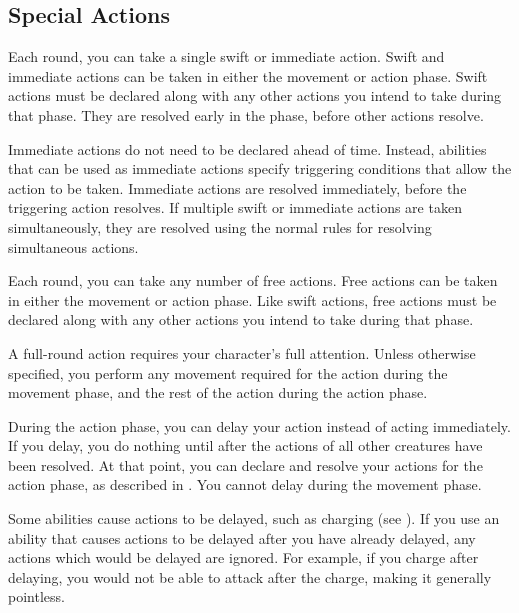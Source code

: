    \subsection{Special Actions}

        \label{Swift and Immediate Actions} Each round, you can take a single swift or immediate action.
        Swift and immediate actions can be taken in either the movement or action phase.
        Swift actions must be declared along with any other actions you intend to take during that phase.
        They are resolved early in the phase, before other actions resolve.

        Immediate actions do not need to be declared ahead of time.
        Instead, abilities that can be used as immediate actions specify triggering conditions that allow the action to be taken.
        Immediate actions are resolved immediately, before the triggering action resolves.
        If multiple swift or immediate actions are taken simultaneously, they are resolved using the normal rules for resolving simultaneous actions.

        \label{Free Actions} Each round, you can take any number of free actions.
        Free actions can be taken in either the movement or action phase.
        Like swift actions, free actions must be declared along with any other actions you intend to take during that phase.

         A full-round action requires your character's full attention.
        Unless otherwise specified, you perform any movement required for the action during the movement phase, and the rest of the action during the action phase.

        \label{Delaying}
        During the action phase, you can delay your action instead of acting immediately.
        If you delay, you do nothing until after the actions of all other creatures have been resolved.
        At that point, you can declare and resolve your actions for the action phase, as described in .
        You cannot delay during the movement phase.

        Some abilities cause actions to be delayed, such as charging (see ).
        If you use an ability that causes actions to be delayed after you have already delayed, any actions which would be delayed are ignored.
        For example, if you charge after delaying, you would not be able to attack after the charge, making it generally pointless.

